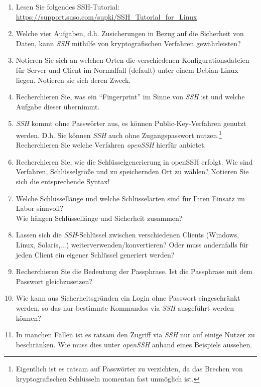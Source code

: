 \documentclass[paper=a4,fontsize=11pt]{scrartcl}%
\begin{document}
	\begin{enumerate}
		\item Lesen Sie folgendes SSH-Tutorial: \url{https://support.suso.com/supki/SSH_Tutorial_for_Linux}
		\item Welche vier Aufgaben, d.h. Zusicherungen in Bezug auf die Sicherheit von Daten, kann \emph{SSH} mithilfe von kryptografischen Verfahren gewährleisten?	
		\item Notieren Sie sich an welchen Orten die verschiedenen Konfigurationsdateien für Server und Client im Normalfall (default) unter einem Debian-Linux liegen. Notieren sie sich deren Zweck.
		\item Recherchieren Sie, was ein \enquote{Fingerprint} im Sinne von \emph{SSH} ist und welche Aufgabe dieser übernimmt. 
		\item \emph{SSH} kommt ohne Passwörter aus, es können Public-Key-Verfahren genutzt werden. D.h. Sie können \emph{SSH} auch ohne Zugangspasswort nutzen.\footnote{Eigentlich ist es ratsam auf Passwörter zu verzichten, da das Brechen von kryptografischen Schlüsseln momentan fast unmöglich ist.}\\
		Recherchieren Sie welche Verfahren \emph{openSSH} hierfür anbietet.
		\item Recherchieren Sie, wie die Schlüsselgenerierung in openSSH erfolgt. Wie sind Verfahren, Schlüsselgröße und zu speichernden Ort zu wählen? Notieren Sie sich die entsprechende Syntax!
		\item Welche Schlüssellänge und welche Schlüsselarten sind für Ihren Einsatz im Labor sinnvoll?\\
		Wie hängen Schlüssellänge und Sicherheit zusammen?
		\item Lassen sich die \emph{SSH}-Schlüssel zwischen verschiedenen Clients (Windows, Linux, Solaris,...) weiterverwenden/konvertieren? Oder muss andernfalls für jeden Client ein eigener Schlüssel generiert werden?
		\item Recherchieren Sie die Bedeutung der Passphrase. Ist die Passphrase mit dem Passwort gleichzusetzen?
		\item Wie kann aus Sicherheitsgründen ein Login ohne Passwort eingeschränkt werden, so das nur bestimmte Kommandos via \emph{SSH} ausgeführt werden können?
		\item In manchen Fällen ist es ratsam den Zugriff via \emph{SSH} nur auf einige Nutzer zu beschränken. Wie muss dies unter \emph{openSSH} anhand eines Beispiels aussehen.
	\end{enumerate}
	
\end{document}
